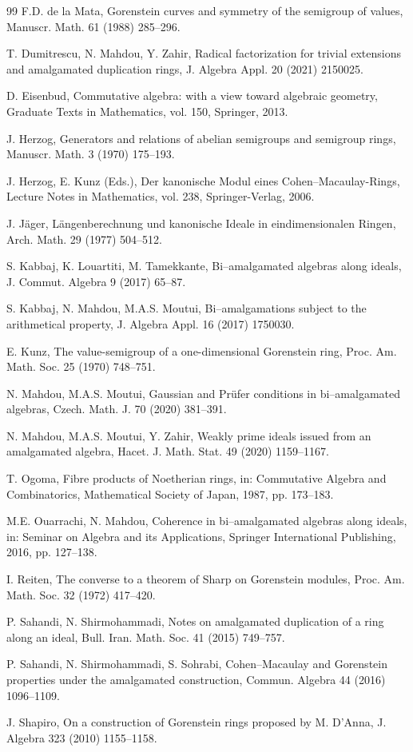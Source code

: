 \documentclass{amsart}%
\theoremstyle{plain}
\numberwithin{equation}{section}
\theoremstyle{definition}
\begin{document}
\begin{thebibliography}{99}
 F.D. de la Mata, Gorenstein curves and symmetry of the semigroup of values, Manuscr. Math. 61 (1988) 285--296.

 T. Dumitrescu, N. Mahdou, Y. Zahir, Radical factorization for trivial extensions and amalgamated duplication rings, J. Algebra Appl. 20 (2021) 2150025.

 D. Eisenbud, Commutative algebra: with a view toward algebraic geometry, Graduate Texts in Mathematics, vol. 150, Springer, 2013.

 J. Herzog, Generators and relations of abelian semigroups and semigroup rings, Manuscr. Math. 3 (1970) 175--193.

 J. Herzog, E. Kunz (Eds.), Der kanonische Modul eines Cohen--Macaulay-Rings, Lecture Notes in Mathematics, vol. 238, Springer-Verlag, 2006.

 J. Jäger, Längenberechnung und kanonische Ideale in eindimensionalen Ringen, Arch. Math. 29 (1977) 504--512.

 S. Kabbaj, K. Louartiti, M. Tamekkante, Bi--amalgamated algebras along ideals, J. Commut. Algebra 9 (2017) 65--87.

 S. Kabbaj, N. Mahdou, M.A.S. Moutui, Bi--amalgamations subject to the arithmetical property, J. Algebra Appl. 16 (2017) 1750030.

 E. Kunz, The value-semigroup of a one-dimensional Gorenstein ring, Proc. Am. Math. Soc. 25 (1970) 748--751.

 N. Mahdou, M.A.S. Moutui, Gaussian and Prüfer conditions in bi--amalgamated algebras, Czech. Math. J. 70 (2020) 381--391.

 N. Mahdou, M.A.S. Moutui, Y. Zahir, Weakly prime ideals issued from an amalgamated algebra, Hacet. J. Math. Stat. 49 (2020) 1159--1167.

 T. Ogoma, Fibre products of Noetherian rings, in: Commutative Algebra and Combinatorics, Mathematical Society of Japan, 1987, pp. 173--183.

 M.E. Ouarrachi, N. Mahdou, Coherence in bi--amalgamated algebras along ideals, in: Seminar on Algebra and its Applications, Springer International Publishing, 2016, pp. 127--138.

 I. Reiten, The converse to a theorem of Sharp on Gorenstein modules, Proc. Am. Math. Soc. 32 (1972) 417--420.

 P. Sahandi, N. Shirmohammadi, Notes on amalgamated duplication of a ring along an ideal, Bull. Iran. Math. Soc. 41 (2015) 749--757.

 P. Sahandi, N. Shirmohammadi, S. Sohrabi, Cohen--Macaulay and Gorenstein properties under the amalgamated construction, Commun. Algebra 44 (2016) 1096--1109.

 J. Shapiro, On a construction of Gorenstein rings proposed by M. D'Anna, J. Algebra 323 (2010) 1155--1158.

\end{thebibliography}


 	
 	
 
\end{document}
